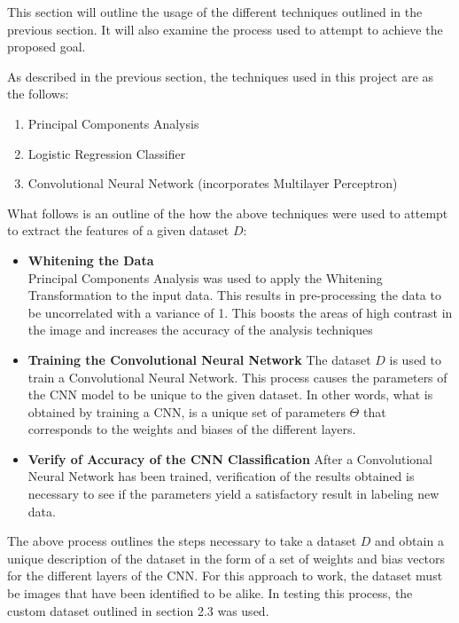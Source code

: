 \documentclass[12pt, titlepage]{article}
\begin{document}
This section will outline the usage of the different techniques outlined in the previous section. It will also examine the
process used to attempt to achieve the proposed goal.

As described in the previous section, the techniques used in this project are as the follows:
\begin{enumerate}
  \item Principal Components Analysis
  \item Logistic Regression Classifier
  \item Convolutional Neural Network (incorporates Multilayer Perceptron)
\end{enumerate}

What follows is an outline of the how the above techniques were used to attempt to extract the features of a given dataset $D$:
\begin{itemize}
  \item \textbf{Whitening the Data} \\
        Principal Components Analysis was used to apply the Whitening Transformation to the input data. This results in
        pre-processing the data to be uncorrelated with a variance of 1. This boosts the areas of high contrast in the image
        and increases the accuracy of the analysis techniques

  \item \textbf{Training the Convolutional Neural Network}
  		The dataset $D$ is used to train a Convolutional Neural Network. This process causes the parameters of the CNN model
  		to be unique to the given dataset. In other words, what is obtained by training a CNN, is a unique set of parameters
  		$\Theta$ that corresponds to the weights and biases of the different layers.
  		
  \item \textbf{Verify of Accuracy of the CNN Classification}
  		After a Convolutional Neural Network has been trained, verification of the results obtained is necessary to see if the
  		parameters yield a satisfactory result in labeling new data. 
\end{itemize}

The above process outlines the steps necessary to take a dataset $D$ and obtain a unique description of the dataset in the
form of a set of weights and bias vectors for the different layers of the CNN. For this approach to work, the dataset must be
images that have been identified to be alike. In testing this process, the custom dataset outlined in section 2.3 was used.
\end{document}
